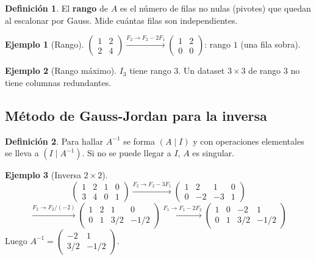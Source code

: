 \documentclass[a4paper,12pt]{article}
\theoremstyle{definition}
\newtheorem{definicion}{Definición}[section]
\newtheorem{ejemplo}{Ejemplo}[section]
\begin{document}
\begin{definicion}
El \textbf{rango} de $A$ es el número de filas no nulas (pivotes) que quedan al escalonar por Gauss. Mide cuántas filas son independientes.
\end{definicion}

\begin{ejemplo}[Rango]
$\begin{pmatrix} 1 & 2 \\ 2 & 4 \end{pmatrix} \xrightarrow{F_2 \to F_2-2F_1} \begin{pmatrix} 1 & 2 \\ 0 & 0 \end{pmatrix}$: rango $1$ (una fila sobra).
\end{ejemplo}

\begin{ejemplo}[Rango máximo]
$I_3$ tiene rango $3$. Un dataset $3 \times 3$ de rango $3$ no tiene columnas redundantes.
\end{ejemplo}

\subsection{Método de Gauss-Jordan para la inversa}
\begin{definicion}
Para hallar $A^{-1}$ se forma $(A \mid I)$ y con operaciones elementales se lleva a $(I \mid A^{-1})$. Si no se puede llegar a $I$, $A$ es singular.
\end{definicion}

\begin{ejemplo}[Inversa $2 \times 2$]
\[
\left(\begin{array}{cc|cc}
1 & 2 & 1 & 0 \\
3 & 4 & 0 & 1
\end{array}\right)
\xrightarrow{F_2 \to F_2-3F_1}
\left(\begin{array}{cc|cc}
1 & 2 & 1 & 0 \\
0 & -2 & -3 & 1
\end{array}\right)
\]
\[
\xrightarrow{F_2 \to F_2/(-2)}
\left(\begin{array}{cc|cc}
1 & 2 & 1 & 0 \\
0 & 1 & 3/2 & -1/2
\end{array}\right)
\xrightarrow{F_1 \to F_1-2F_2}
\left(\begin{array}{cc|cc}
1 & 0 & -2 & 1 \\
0 & 1 & 3/2 & -1/2
\end{array}\right)
\]
Luego $A^{-1}=\begin{pmatrix} -2 & 1 \\ 3/2 & -1/2 \end{pmatrix}$.
\end{ejemplo}
\end{document}
